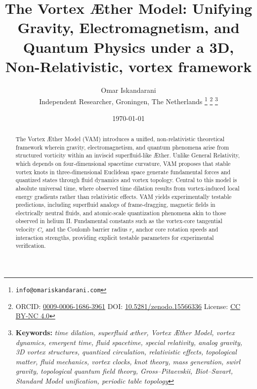 \documentclass[a4paper,12pt]{article}
\begin{document}
    \title{The Vortex Æther Model: Unifying Gravity, Electromagnetism, and Quantum Physics under a 3D, Non-Relativistic, vortex framework}
    \date{\today}
    \author{
        Omar Iskandarani\\
        \small Independent Researcher, Groningen, The Netherlands
        \thanks{\texttt{info@omariskandarani.com}}
        \thanks{ORCID: \href{https://orcid.org/0009-0006-1686-3961}{0009-0006-1686-3961} \quad DOI: \href{https://doi.org/10.5281/zenodo.15566336}{10.5281/zenodo.15566336} \quad License: \href{https://creativecommons.org/licenses/by/4.0/}{CC BY-NC 4.0}}
        \noindent\thanks{\textbf{Keywords:} \textit{time dilation, superfluid æther, Vortex Æther Model, vortex dynamics, emergent time, fluid spacetime, special relativity, analog gravity, 3D vortex structures, quantized circulation, relativistic effects, topological matter, fluid mechanics, vortex clocks, knot theory, mass generation, swirl gravity, topological quantum field theory, Gross--Pitaevskii, Biot--Savart, Standard Model unification, periodic table topology}}
    }
    \maketitle
    \begin{abstract}
        The Vortex Æther Model (VAM) introduces a unified, non-relativistic theoretical framework wherein gravity, electromagnetism, and quantum phenomena arise from structured vorticity within an inviscid superfluid-like Æther. Unlike General Relativity, which depends on four-dimensional spacetime curvature, VAM proposes that stable vortex knots in three-dimensional Euclidean space generate fundamental forces and quantized states through fluid dynamics and vortex topology. Central to this model is absolute universal time, where observed time dilation results from vortex-induced local energy gradients rather than relativistic effects. VAM yields experimentally testable predictions, including superfluid analogs of frame-dragging, magnetic fields in electrically neutral fluids, and atomic-scale quantization phenomena akin to those observed in helium II. Fundamental constants such as the vortex-core tangential velocity $C_e$ and the Coulomb barrier radius $r_c$ anchor core rotation speeds and interaction strengths, providing explicit testable parameters for experimental verification.
    \end{abstract}

\newpage
    \tableofcontents
\end{document}
